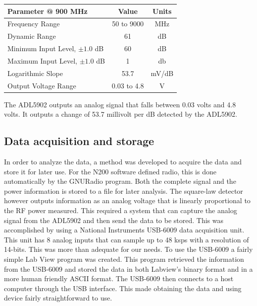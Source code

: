 \begin{table}[h!tb] \centering
{}
\label{ADL5902_data}
\begin{tabular}{lcc} \hline
\textbf{Parameter @ 900 MHz} & \textbf{Value} & \textbf{Units} \\ \hline
Frequency Range & 50 to 9000 & MHz \\
Dynamic Range & 61 & dB \\
Minimum Input Level, $\pm 1.0$ dB & 60 & dB \\ 
Maximum Input Level, $\pm 1.0$ dB & 1 & db \\
Logarithmic Slope & 53.7 & mV/dB \\ 
Output Voltage Range & 0.03 to 4.8 & V \\ \hline
\end{tabular}
\end{table}

The ADL5902 outputs an analog signal that falls between 0.03 volts and 4.8 volts.  It outputs a change of 53.7 millivolt per dB detected by the ADL5902.  

\subsection{Data acquisition and storage}

In order to analyze the data, a method was developed to acquire the data and store it for later use.  For the N200 software defined radio, this is done automatically by the GNURadio program.  Both the complete signal and the power information is stored to a file for later analysis.  The square-law detector however outputs information as an analog voltage that is linearly proportional to the RF power measured.  This required a system that can capture the analog signal from the ADL5902 and then send the data to be stored.  This was accomplished by using a National Instruments USB-6009 data acquisition unit.  This unit has 8 analog inputs that can sample up to 48 ksps with a resolution of 14-bits.  This was more than adequate for our needs.  To use the USB-6009 a fairly simple Lab View program was created.  This program retrieved the information from the USB-6009 and stored the data in both Labview's binary format and in a more human friendly ASCII format.  The USB-6009 then connects to a host computer through the USB interface.  This made obtaining the data and using device fairly straightforward to use.

